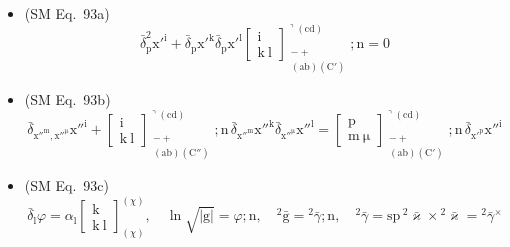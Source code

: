 \documentclass[
    12pt,              %
    a4paper,           %
    headings=normal,   %
    twoside=true,      %
    BCOR=8mm,          %
]{scrbook}
\begin{document}
\begin{itemize}[label={},leftmargin=0pt]
    \item (SM Eq.\ 93a) 
    \[
    \bar{\delta}_\mathrm{p}^2 \mathrm{x'^i} + \bar{\delta}_\mathrm{p} \mathrm{x'^k} \bar{\delta}_\mathrm{p} \mathrm{x'^l} \left[ \begin{smallmatrix} \mathrm{i} \\ \mathrm{k\ l} \end{smallmatrix} \right]^{\urcorner(\mathrm{cd})}_{\substack{- + \\ (\mathrm{ab})(\mathrm{C'})}} ; \mathrm{n} = 0
    \]

    \item (SM Eq.\ 93b) 
    \[
    \bar{\delta}_{\mathrm{x''^m}, \mathrm{x''^\mu}} \mathrm{x''^i} + \left[ \begin{smallmatrix} \mathrm{i} \\ \mathrm{k\ l} \end{smallmatrix} \right]^{\urcorner(\mathrm{cd})}_{\substack{- + \\ (\mathrm{ab})(\mathrm{C''})}} ; \mathrm{n} \,\bar{\delta}_{\mathrm{x''^m}} \mathrm{x''^k} \bar{\delta}_{\mathrm{x''^\mu}} \mathrm{x''^l} = \left[ \begin{smallmatrix} \mathrm{p} \\ \mathrm{m\ \mu} \end{smallmatrix} \right]^{\urcorner(\mathrm{cd})}_{\substack{- + \\ (\mathrm{ab})(\mathrm{C'})}} ; \mathrm{n} \,\bar{\delta}_{\mathrm{x'^p}} \mathrm{x''^i}
    \]

    \item (SM Eq.\ 93c) 
    \[
    \bar{\delta}_\mathrm{l} \varphi = \alpha_\mathrm{l} \left[ \begin{smallmatrix} \mathrm{k} \\ \mathrm{k\ l} \end{smallmatrix} \right]^{(\chi)}_{(\chi)}, \quad \ln\sqrt{|\mathrm{g}|} = \varphi;\mathrm{n}, \quad {}^2\bar{\mathrm{g}} = {}^2\bar{\gamma};\mathrm{n}, \quad {}^2\bar{\gamma} = \mathrm{sp}\,{}^2\bar{\varkappa} \times {}^2\bar{\varkappa} = {}^2\bar{\gamma}^\times
    \]


\end{itemize}
\end{document}
